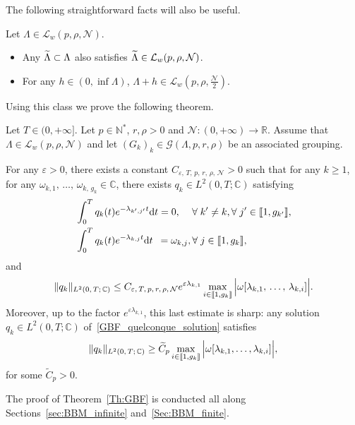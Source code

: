 \documentclass[AHL,Unicode,longabstracts]{cedram}
\newcommand{\llbracket}{\mathopen{[\mkern -2.7mu[}}
\newcommand{\rrbracket}{\mathclose{]\mkern -2.7mu]}}
\newcommand{\inter}[2]{\llbracket #1,#2 \rrbracket}
\newcommand{\n}{g}
\newcommand{\LL}{\mathcal{L}}
\newcommand{\NN}{\mathcal{N}}
\newcommand{\N}{\mathbb{N}}
\newcommand{\R}{\mathbb{R}}
\newcommand{\C}{\mathbb{C}}
\newcommand{\md}{\mathrm{d}}
\let\oldtilde\tilde
\renewcommand*{\tilde}[1]{\mathchoice{\widetilde{#1}}{\widetilde{#1}}{\oldtilde{#1}}{\oldtilde{#1}}}\let\oldexists\exists
\renewcommand*{\exists}{\mathrel{\oldexists}}
\let\oldforall\forall
\renewcommand*{\forall}{\mathrel{\oldforall}}
\begin{document}
The following straightforward facts will also be useful.
\begin{rema}\label{Rem:stabilite_Lw_inclusion}
Let $\Lambda\in \LL_w(p,\rho,\NN)$.
\begin{itemize}
\item Any $\tilde{\Lambda}\subset \Lambda$ also satisfies $\tilde{\Lambda}\in \LL_w(p,\rho,\NN)$.
\item For any $h \in (0,\inf \Lambda)$, $\Lambda+h\in \LL_w \left(p,\rho, \frac{\NN}{2} \right)$.
\end{itemize}
\end{rema}


Using this class we prove the following theorem.
\begin{theo} \label{Th:GBF}
Let $T \in (0,+\infty]$. Let $p \in \N^*$, $r, \rho > 0$ and $\NN : (0,+\infty) \to \R$. Assume that $\Lambda \in \LL_w(p,\rho, \NN)$ and let $(G_k)_k\in \mathcal{G}(\Lambda,p,r,\rho)$ be an associated grouping.

For any $\varepsilon > 0$, there exists a constant $C_{\varepsilon,\,T,\, p,\, r,\, \rho,\, \NN} >0$ such that for any $k \geq 1$, for any $\omega_{k,1},\,\dots,\,\omega_{k,\,\n_k} \in \C$, there exists $q_k \in L^2(0,T ; \C)$ satisfying
\begin{subequations}\label{GBF_quelconque}
\begin{align}
& \int_0^T q_k(t) e^{-\lambda_{k',j'} t } \md t= 0,\quad\,\forall k' \neq k, \forall j' \in \inter{1}{\n_{k'}},\label{GBF_quelconque_ortho}
\\
& \int_0^T q_k(t) e^{-\lambda_{k,j} t } \md t\;\:= \omega_{k,j}, \forall j \in \inter{1}{\n_k},\label{GBF_quelconque_solution}
\end{align}
\end{subequations}
and
\begin{equation}\label{Estimee_GBF}
\| q_k \|_{L^2(0,\,T ;\,\C)} \leq C_{\varepsilon,\,T,\,p,\,r,\,\rho,\,\NN} e^{\varepsilon \lambda_{k,1}} \max \limits_{i\in \inter{1}{\n_k}} \Big| \omega[\lambda_{k,1},\,\dots,\,\lambda_{k,i}] \Big|.
\end{equation}
Moreover, up to the factor $e^{\varepsilon \lambda_{k,1}}$, this last estimate is sharp: any solution $q_k \in L^2(0,T ; \C)$ of~\eqref{GBF_quelconque_solution} satisfies
\begin{equation}\label{Estimee_Inferieure_GBF}
\| q_k \|_{L^2(0,\,T ;\,\C)} \geq \widetilde{C}_{p} \max \limits_{i\in \inter{1}{\n_k}} \Big| \omega[\lambda_{k,1}, \dots, \lambda_{k,i}] \Big|,
\end{equation}
for some $\widetilde{C}_{p} >0$.
\end{theo} The proof of Theorem~\ref{Th:GBF} is conducted all along Sections~\ref{sec:BBM_infinite} and~\ref{Sec:BBM_finite}.
\end{document}
